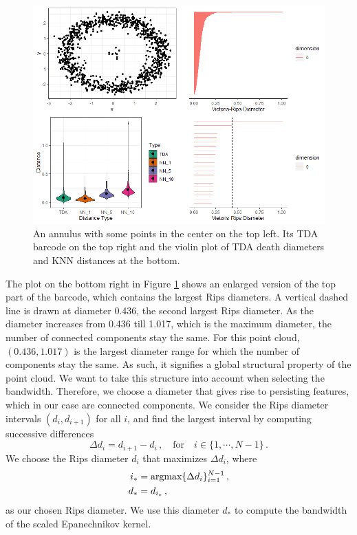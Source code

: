 \documentclass[11pt,a4paper,]{article}
\newcommand{\argmax}{\mathop{\text{argmax}}}
\theoremstyle{definition}
\theoremstyle{definition}
\theoremstyle{definition}
\theoremstyle{remark}
\begin{document}
\begin{figure}[!ht]
    \centering
    \includegraphics[scale=0.8]{../Graphics/TDA_and_KNN.png}
    \caption{An annulus with some points in the center on the top left. Its TDA barcode on the top right and the violin plot of TDA death diameters and KNN distances at the bottom.}
    \label{fig:TDAKNN}
\end{figure}

The plot on the bottom right in Figure \ref{fig:TDAKNN} shows an enlarged version of the top part of the barcode, which contains the largest Rips diameters. A vertical dashed line is drawn at diameter 0.436, the second largest Rips diameter. As the diameter increases from 0.436 till 1.017, which is the maximum diameter, the number of connected components stay the same. For this point cloud, \((0.436, 1.017)\) is the largest diameter range for which the number of components stay the same. As such, it signifies a global structural property of the point cloud. We want to take this structure into account when selecting the bandwidth. Therefore, we choose a diameter that gives rise to persisting features, which in our case are connected components. We consider the Rips diameter intervals \((d_i, d_{i+1})\) for all \(i\), and find the largest interval by computing successive differences
\begin{equation}\label{eq:deathrad1}
    \Delta d_i = d_{i+1} - d_i\, ,  \quad \text{for} \quad i \in \{1, \cdots,  N-1 \} \, . 
\end{equation}
We choose the Rips diameter \(d_i\) that maximizes \(\Delta d_i\), where
\begin{align}\label{eq:deathrad2}
    i_* &= \argmax \{ \Delta d_i \}_{i=1}^{N-1}  \, , \notag\\
    d_* &= d_{i_*} \, ,
\end{align}
as our chosen Rips diameter. We use this diameter \(d_*\) to compute the bandwidth of the scaled Epanechnikov kernel.
\end{document}
